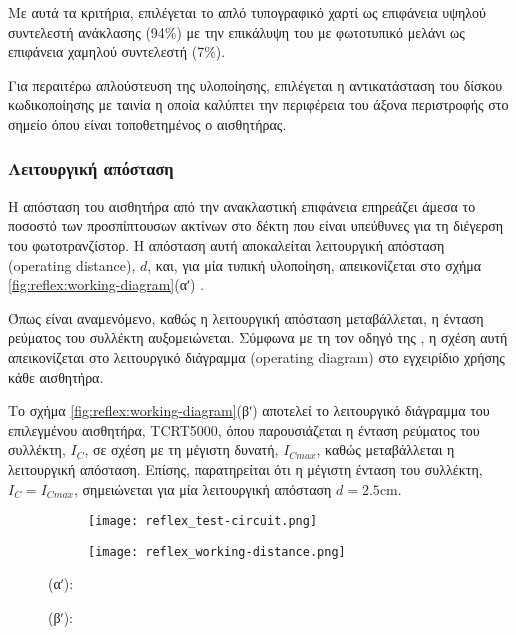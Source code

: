 Με αυτά τα κριτήρια, επιλέγεται το απλό τυπογραφικό χαρτί ως επιφάνεια υψηλού
συντελεστή ανάκλασης (94\%) με την επικάλυψη του με φωτοτυπικό μελάνι ως
επιφάνεια χαμηλού συντελεστή (7\%).

Για περαιτέρω απλούστευση της υλοποίησης, επιλέγεται η αντικατάσταση του δίσκου
κωδικοποίησης με ταινία η οποία καλύπτει την περιφέρεια του άξονα περιστροφής
στο σημείο όπου είναι τοποθετημένος ο αισθητήρας.



\subsubsection{Λειτουργική απόσταση}

Η απόσταση του αισθητήρα από την ανακλαστική επιφάνεια επηρεάζει άμεσα το
ποσοστό των προσπίπτουσων ακτίνων στο δέκτη που είναι υπεύθυνες για τη διέγερση
του φωτοτρανζίστορ. Η απόσταση αυτή αποκαλείται λειτουργική απόσταση
 (operating distance), $d$, και, για μία
τυπική υλοποίηση, απεικονίζεται στο σχήμα \ref{fig:reflex:working-diagram}(αʹ)
\parencite{vishay02}.

Όπως είναι αναμενόμενο, καθώς η λειτουργική απόσταση μεταβάλλεται, η ένταση
ρεύματος του συλλέκτη αυξομειώνεται. Σύμφωνα με τη τον οδηγό της
\textcite{vishay06}, η σχέση αυτή απεικονίζεται στο λειτουργικό διάγραμμα
 (operating diagram) στο εγχειρίδιο χρήσης
κάθε αισθητήρα.

Το σχήμα \ref{fig:reflex:working-diagram}(βʹ) αποτελεί το λειτουργικό διάγραμμα
του επιλεγμένου αισθητήρα, TCRT5000, όπου παρουσιάζεται η ένταση ρεύματος του
συλλέκτη, $I_{C}$, σε σχέση με τη μέγιστη δυνατή, $I_{Cmax}$, καθώς μεταβάλλεται
η λειτουργική απόσταση.
Επίσης, παρατηρείται ότι η μέγιστη ένταση του συλλέκτη, $I_{C} = I_{Cmax}$,
σημειώνεται για μία λειτουργική απόσταση $d = 2.5$cm.

\begin{figure}
    \caption{Λειτουργική απόσταση και λειτουργικό διάγραμμα.
        \label{fig:reflex:working-diagram}}
    \begin{center}
        \begin{subfigure}[b]{0.45\textwidth}
            \texttt{[image: reflex\_test-circuit.png]}
            \caption{}
        \end{subfigure}
        \begin{subfigure}[b]{0.45\textwidth}
            \texttt{[image: reflex\_working-distance.png]}
            \caption{}
        \end{subfigure}
    \end{center}

    (αʹ): 

    (βʹ): 
\end{figure}

